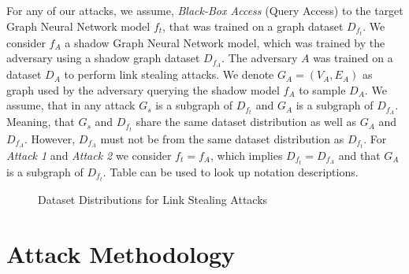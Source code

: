     For any of our attacks, we assume, \emph{Black-Box Access} (Query Access) to the target Graph Neural Network model $f_t$, that was trained on a graph dataset $D_{f_t}$.
    We consider $f_A$ a shadow Graph Neural Network model, which was trained by the adversary using a shadow graph dataset $D_{f_A}$.
    The adversary $A$ was trained on a dataset $D_A$ to perform link stealing attacks.
    We denote $G_A = (V_A, E_A)$ as graph used by the adversary querying the shadow model $f_A$ to sample $D_A$.
    We assume, that in any attack $G_s$ is a subgraph of $D_{f_t}$ and $G_A$ is a subgraph of $D_{f_A}$.
    Meaning, that $G_s$ and $D_{f_t}$ share the same dataset distribution as well as $G_A$ and $D_{f_A}$.
    However, $D_{f_A}$ must not be from the same dataset distribution as $D_{f_t}$.
    For \emph{Attack 1} and \emph{Attack 2} we consider $f_t = f_A$, which implies $D_{f_t} = D_{f_A}$ and that $G_A$ is a subgraph of $D_{f_t}$. 
    Table  can be used to look up notation descriptions.

    \begin{figure}[h!]
      \caption{Dataset Distributions for Link Stealing Attacks}
      \label{figure:dataset-distribution}
    \end{figure}

    

  \section{Attack Methodology}

